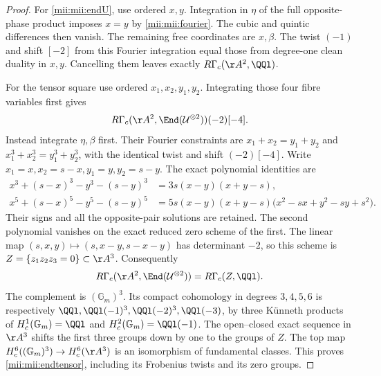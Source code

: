 \documentclass[11pt,a4paper]{article}
\begin{document}
\begin{proof}
For \eqref{mii:mii:endU}, use ordered $x,y$. Integration in $\eta$ of the
full opposite-phase product imposes $x=y$ by \eqref{mii:mii:fourier}.
The cubic and quintic differences then vanish. The remaining free
coordinates are $x,\beta$. The twist $(-1)$ and shift $[-2]$ from this
Fourier integration equal those from degree-one clean duality in $x,y$.
Cancelling them leaves exactly $R\Gamma_c(\AA^2,\QQl)$.

For the tensor square use ordered $x_1,x_2,y_1,y_2$. Integrating those
four fibre variables first gives
\[
 R\Gamma_c(\AA^2,\End(\mathcal U^{\otimes2}))(-2)[-4].
\]
Instead integrate $\eta,\beta$ first. Their Fourier constraints are
$x_1+x_2=y_1+y_2$ and $x_1^3+x_2^3=y_1^3+y_2^3$, with the identical
twist and shift $(-2)[-4]$. Write $x_1=x,x_2=s-x,y_1=y,y_2=s-y$.
The exact polynomial identities are
\begin{equation}\tag{MII12}\label{mii:mii:phasefactor}
 \begin{aligned}
 x^3+(s-x)^3-y^3-(s-y)^3
     &=3s(x-y)(x+y-s),\\
 x^5+(s-x)^5-y^5-(s-y)^5
     &=5s(x-y)(x+y-s)\bigl(x^2-sx+y^2-sy+s^2\bigr).
 \end{aligned}
\end{equation}
Their signs and all the opposite-pair solutions are retained. The
second polynomial vanishes on the exact reduced zero scheme of the
first. The linear map
$(s,x,y)\mapsto(s,x-y,s-x-y)$ has determinant $-2$, so this scheme
is $Z=\{z_1z_2z_3=0\}\subset\AA^3$. Consequently
\[
 R\Gamma_c(\AA^2,\End(\mathcal U^{\otimes2}))
       =R\Gamma_c(Z,\QQl).
\]
The complement is $(\mathbb G_m)^3$. Its compact cohomology in degrees
$3,4,5,6$ is respectively
$\QQl,\QQl(-1)^3,\QQl(-2)^3,\QQl(-3)$, by three K\"unneth products
of $H_c^1(\mathbb G_m)=\QQl$ and $H_c^2(\mathbb G_m)=\QQl(-1)$.
The open--closed exact sequence in $\AA^3$ shifts the first three
groups down by one to the groups of $Z$. The top map
$H_c^6((\mathbb G_m)^3)\to H_c^6(\AA^3)$ is an isomorphism of
fundamental classes. This proves \eqref{mii:mii:endtensor}, including its
Frobenius twists and its zero groups.


\end{proof}
\end{document}
